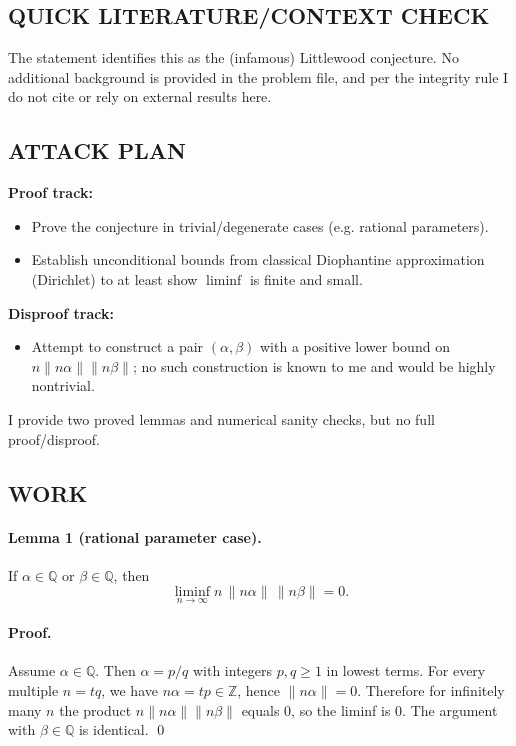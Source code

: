 \subsection*{QUICK LITERATURE/CONTEXT CHECK}
The statement identifies this as the (infamous) Littlewood conjecture. No additional background is provided in the problem file, and per the integrity rule I do not cite or rely on external results here.

\subsection*{ATTACK PLAN}
\textbf{Proof track:}
\begin{itemize}
\item Prove the conjecture in trivial/degenerate cases (e.g. rational parameters).
\item Establish unconditional bounds from classical Diophantine approximation (Dirichlet) to at least show $\liminf$ is finite and small.
\end{itemize}
\textbf{Disproof track:}
\begin{itemize}
\item Attempt to construct a pair $(\alpha,\beta)$ with a positive lower bound on $n\|n\alpha\|\|n\beta\|$; no such construction is known to me and would be highly nontrivial.
\end{itemize}
I provide two proved lemmas and numerical sanity checks, but no full proof/disproof.

\subsection*{WORK}
\paragraph{Lemma 1 (rational parameter case).}
If $\alpha\in\mathbb{Q}$ or $\beta\in\mathbb{Q}$, then
\[\liminf_{n\to\infty} n\,\|n\alpha\|\,\|n\beta\| = 0.
\]

\paragraph{Proof.}
Assume $\alpha\in\mathbb{Q}$. Then $\alpha=p/q$ with integers $p,q\ge 1$ in lowest terms.
For every multiple $n=tq$, we have $n\alpha=tp\in\mathbb{Z}$, hence $\|n\alpha\|=0$.
Therefore for infinitely many $n$ the product $n\|n\alpha\|\|n\beta\|$ equals $0$, so the liminf is $0$.
The argument with $\beta\in\mathbb{Q}$ is identical.
\qed

